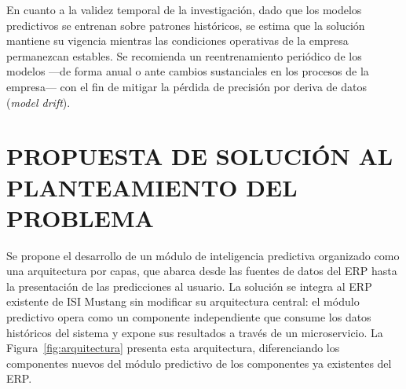 \documentclass{univalle-perfil}
\begin{document}
En cuanto a la validez temporal de la investigación, dado que los modelos predictivos se entrenan sobre patrones históricos, se estima que la solución mantiene su vigencia mientras las condiciones operativas de la empresa permanezcan estables. Se recomienda un reentrenamiento periódico de los modelos —de forma anual o ante cambios sustanciales en los procesos de la empresa— con el fin de mitigar la pérdida de precisión por deriva de datos (\textit{model drift}).

\section{PROPUESTA DE SOLUCIÓN AL PLANTEAMIENTO DEL PROBLEMA}

Se propone el desarrollo de un módulo de inteligencia predictiva organizado como una arquitectura por capas, que abarca desde las fuentes de datos del ERP hasta la presentación de las predicciones al usuario. La solución se integra al ERP existente de ISI Mustang sin modificar su arquitectura central: el módulo predictivo opera como un componente independiente que consume los datos históricos del sistema y expone sus resultados a través de un microservicio. La Figura~\ref{fig:arquitectura} presenta esta arquitectura, diferenciando los componentes nuevos del módulo predictivo de los componentes ya existentes del ERP.
\end{document}
